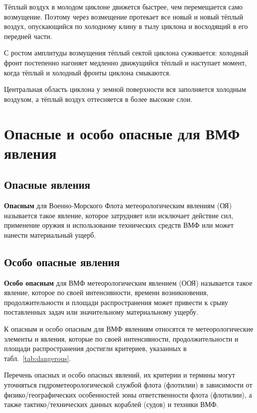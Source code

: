 \documentclass[a4paper, 12pt, twoside, final, book, russian, fittopage, cyremdash, openright]{ncc}
\begin{document}
Тёплый воздух в молодом циклоне движется быстрее, чем перемещается
само возмущение. Поэтому через возмещение протекает все новый и новый
тёплый воздух, опускающийся по холодному клину в тылу циклона и
восходящий в его передней части.

С ростом амплитуды возмущения тёплый сектой циклона суживается:
холодный фронт постепенно нагоняет медленно движущийся тёплый и
наступает момент, когда тёплый и холодный фронты циклона смыкаются.

Центральная область циклона у земной поверхности вся заполняется
холодным воздухом, а тёплый воздух оттесняется в более высокие слои.

\section{Опасные и особо опасные для ВМФ явления}
\label{sec:dangerous}

\subsection{Опасные явления}

\textbf{Опасным} для Военно-Морского Флота метеорологическим явлениям
(ОЯ) называется такое явление, которое затрудняет или исключает
действие сил, применение оружия и использование технических средств
ВМФ или может нанести материальный ущерб.

\subsection{Особо опасные явления}

\textbf{Особо опасным} для ВМФ метеорологическим явлением (ООЯ)
называется такое явление, которое по своей интенсивности, времени
возникновения, продолжительности и площади распространения может
привести к срыву поставленных задач или значительному материальному
ущербу.

К опасным и особо опасным для ВМФ явлениям относятся те
метеорологические элементы и явления, которые по своей интенсивности,
продолжительности и площади распространения достигли критериев,
указанных в табл.~\ref{tab:dangerous}.

Перечень опасных и особо опасных явлений, их критерии и термины могут
уточняться гидрометеорологической службой флота (флотилии) в
зависимости от физико\-/географических особенностей зоны ответственности
флота (флотилии), а также тактико\-/технических данных кораблей (судов)
и техники ВМФ.
\end{document}
